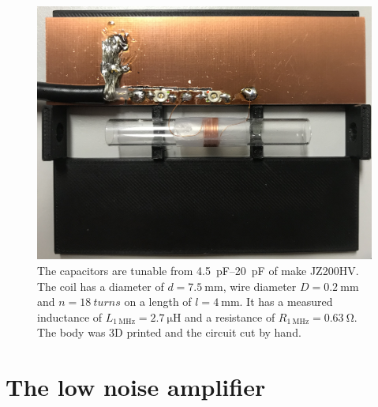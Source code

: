 \begin{figure}[hbt]
    \centering
    \includegraphics{images/probe.jpg}
    \caption{ The capacitors are tunable from \qtyrange{4.5}{20}{\pico\farad} of make JZ200HV. The coil has a diameter of \(d = \qty{7.5}{\milli\meter}\), wire diameter \(D = \qty{0.2}{\milli\meter}\) and \(n = \qty{18}{turns}\) on a length of \(l = \qty{4}{\milli\meter}\). It has a measured inductance of \(L_{\qty{1}{\mega\hertz}} = \qty{2.7}{\micro\henry}\) and a resistance of \(R_{\qty{1}{\mega\hertz}} = \qty{0.63}{\ohm}\). The body was 3D printed and the circuit cut by hand.}
\end{figure}

\section{The low noise amplifier}


